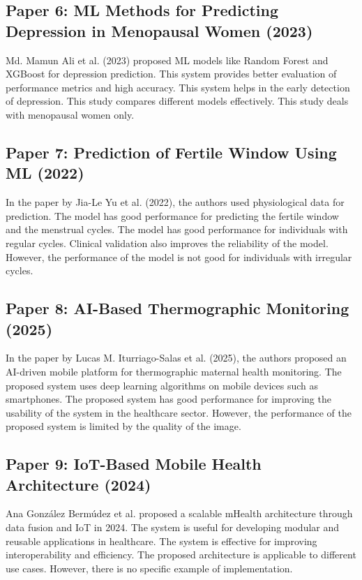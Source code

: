 \subsection{Paper 6: ML Methods for Predicting Depression in Menopausal Women (2023)}
Md. Mamun Ali et al. (2023) proposed ML models like Random Forest and XGBoost for depression prediction. This system provides better evaluation of performance metrics and high accuracy. This system helps in the early detection of depression. This study compares different models effectively. This study deals with menopausal women only. \cite{ali2023,isayev2023}

\subsection{Paper 7: Prediction of Fertile Window Using ML (2022)}
In the paper by Jia-Le Yu et al. (2022), the authors used physiological data for prediction. The model has good performance for predicting the fertile window and the menstrual cycles. The model has good performance for individuals with regular cycles. Clinical validation also improves the reliability of the model. However, the performance of the model is not good for individuals with irregular cycles. \cite{yu2022,goodale2019}

\subsection{Paper 8: AI-Based Thermographic Monitoring (2025)}
In the paper by Lucas M. Iturriago-Salas et al. (2025), the authors proposed an AI-driven mobile platform for thermographic maternal health monitoring. The proposed system uses deep learning algorithms on mobile devices such as smartphones. The proposed system has good performance for improving the usability of the system in the healthcare sector. However, the performance of the proposed system is limited by the quality of the image. \cite{iturriago2025}

\subsection{Paper 9: IoT-Based Mobile Health Architecture (2024)}
Ana Gonz\'{a}lez Berm\'{u}dez et al. proposed a scalable mHealth architecture through data fusion and IoT in 2024. The system is useful for developing modular and reusable applications in healthcare. The system is effective for improving interoperability and efficiency. The proposed architecture is applicable to different use cases. However, there is no specific example of implementation. \cite{kilungeja2025}

